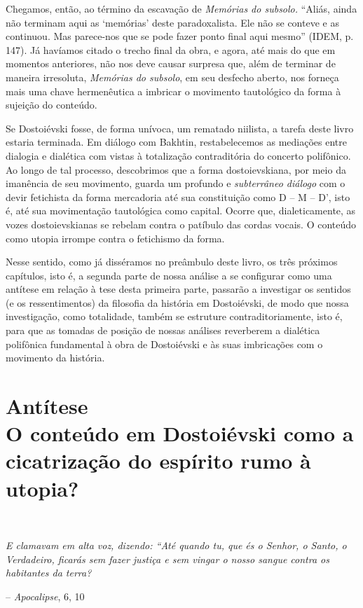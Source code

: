 Chegamos, então, ao término da escavação de \emph{Memórias do subsolo.}
``Aliás, ainda não terminam aqui as `memórias' deste paradoxalista. Ele
não se conteve e as continuou. Mas parece-nos que se pode fazer ponto
final aqui mesmo'' (IDEM, p. 147). Já havíamos citado o trecho final da
obra, e agora, até mais do que em momentos anteriores, não nos deve
causar surpresa que, além de terminar de maneira irresoluta,
\emph{Memórias do subsolo}, em seu desfecho aberto, nos forneça mais uma
chave hermenêutica a imbricar o movimento tautológico da forma à
sujeição do conteúdo.

Se Dostoiévski fosse, de forma unívoca, um rematado niilista, a tarefa
deste livro estaria terminada. Em diálogo com Bakhtin, restabelecemos as
mediações entre dialogia e dialética com vistas à totalização
contraditória do concerto polifônico. Ao longo de tal processo,
descobrimos que a forma dostoievskiana, por meio da imanência de seu
movimento, guarda um profundo e \emph{subterrâneo diálogo} com o devir
fetichista da forma mercadoria até sua constituição como D -- M -- D',
isto é, até sua movimentação tautológica como capital. Ocorre que,
dialeticamente, as vozes dostoievskianas se rebelam contra o patíbulo
das cordas vocais. O conteúdo como utopia irrompe contra o fetichismo da
forma.

Nesse sentido, como já disséramos no preâmbulo deste livro, os três
próximos capítulos, isto é, a segunda parte de nossa análise a se
configurar como uma antítese em relação à tese desta primeira parte,
passarão a investigar os sentidos (e os ressentimentos) da filosofia da
história em Dostoiévski, de modo que nossa investigação, como
totalidade, também se estruture contraditoriamente, isto é, para que as
tomadas de posição de nossas análises reverberem a dialética polifônica
fundamental à obra de Dostoiévski e às suas imbricações com o movimento
da história.

\part[Parte II -- Antítese]
{Antítese\\[\bigskipamount] 
      \large O conteúdo em Dostoiévski como a cicatrização do espírito rumo à utopia?}

\vspace*{\fill}

\, \ 
\begin{minipage}{0.84\textwidth}
\scriptsize\emph{E clamavam em alta voz, dizendo: ``Até quando tu, que és o Senhor, o
Santo, o Verdadeiro, ficarás sem fazer justiça e sem vingar o nosso
sangue contra os habitantes da terra?}

\smallskip
\hspace*{\fill}-- \emph{Apocalipse}, 6, 10
\end{minipage}

